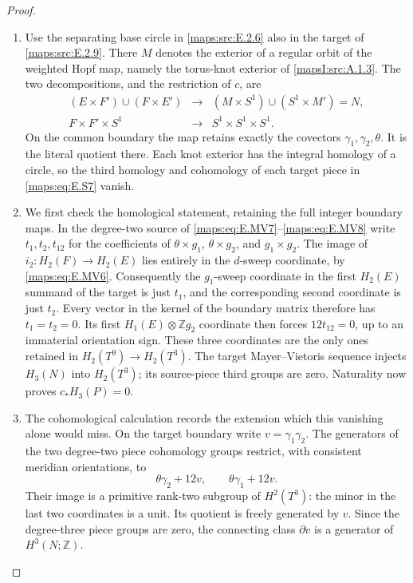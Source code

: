 \begin{proof}
\begin{enumerate}[label=\arabic*.,leftmargin=*]
\item Use the separating base circle in \ref{maps:src:E.2.6} also in the target of
\ref{maps:src:E.2.9}. There $M$ denotes the exterior of a regular orbit of the
weighted Hopf map, namely the torus-knot exterior of \cref{mapsI:src:A.1.3}. The
two decompositions, and the restriction of $c$, are
\[
 \begin{array}{ccc}
 (E\times F')\cup(F\times E')&\longrightarrow&
                  (M\times S^1)\cup(S^1\times M')=N,\\
 F\times F'\times S^1&\longrightarrow&S^1\times S^1\times S^1.
 \end{array}
 \tag{E.S7}\label{maps:eq:E.S7}
\]
On the common boundary the map retains exactly the covectors
$\gamma_1,\gamma_2,\theta$. It is the literal quotient there.
Each knot exterior has the integral homology of a circle, so the
third homology and cohomology of each target piece in \eqref{maps:eq:E.S7} vanish.

\item We first check the homological statement, retaining the full
integer boundary maps. In the degree-two source of \eqref{maps:eq:E.MV7}--\eqref{maps:eq:E.MV8}
write $t_1,t_2,t_{12}$ for the coefficients of
$\theta\times g_1$, $\theta\times g_2$, and $g_1\times g_2$.
The image of $i_2:H_2(F)\to H_2(E)$ lies entirely in the
$d$-sweep coordinate, by \eqref{maps:eq:E.MV6}. Consequently the $g_1$-sweep
coordinate in the first $H_2(E)$ summand of the target is just
$t_1$, and the corresponding second coordinate is just $t_2$.
Every vector in the kernel of the boundary matrix therefore has
$t_1=t_2=0$. Its first $H_1(E)\otimes\mathbb Zg_2$ coordinate
then forces $12t_{12}=0$, up to an immaterial orientation sign.
These three coordinates are the only ones retained in
$H_2(T^9)\to H_2(T^3)$. The target Mayer--Vietoris sequence
injects $H_3(N)$ into $H_2(T^3)$; its source-piece third groups
are zero. Naturality now proves $c_*H_3(P)=0$.

\item The cohomological calculation records the extension which this
vanishing alone would miss. On the target boundary write
$v=\gamma_1\gamma_2$. The generators of the two degree-two
piece cohomology groups restrict, with consistent meridian
orientations, to
\[
       \theta\gamma_2+12v,
       \qquad \theta\gamma_1+12v.
 \tag{E.S8}\label{maps:eq:E.S8}
\]
Their image is a primitive rank-two subgroup of $H^2(T^3)$:
the minor in the last two coordinates is a unit. Its quotient
is freely generated by $v$. Since the degree-three piece groups
are zero, the connecting class $\partial v$ is a generator of
$H^3(N;\mathbb Z)$.


\end{enumerate}
\end{proof}

